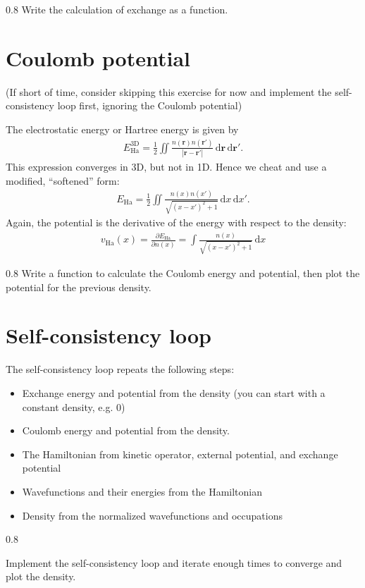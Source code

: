 \documentclass{article}
\newcommand{\exercise}[1]{
  \bigskip
  \begin{boxedminipage}[c]{0.8\linewidth}
  #1
  \end{boxedminipage}
  \bigskip
}
\newcommand{\dee}[0]{\mathrm d}
\newcommand{\idee}[0]{\,\dee}
\newcommand{\pdiff}[2]{\frac{\partial #1}{\partial #2}}
\begin{document}
\exercise{Write the calculation of exchange as a function.}

\section{Coulomb potential}
(If short of time, consider skipping this exercise for now and implement the
self-consistency loop first, ignoring the Coulomb potential)

The electrostatic energy or Hartree energy is given by
\begin{align}
  E_{\mathrm{Ha}}^{\mathrm{3D}} = \frac12 \iint \frac{n(\mathbf r)n(\mathbf r')}{|\mathbf r - \mathbf r'|}\idee \mathbf r \idee \mathbf r'.
\end{align}
This expression converges in 3D, but not in 1D.  Hence we cheat and use
a modified, ``softened'' form:
\begin{align}
E_{\mathrm{Ha}} = \frac12 \iint \frac{n(x) n(x')}{\sqrt{(x - x')^2 + 1}}
\idee x \idee x'.
\end{align}
Again, the potential is the derivative of the energy with respect to the
density:
\begin{align}
  v_{\mathrm{Ha}}(x) = \pdiff{E_{\mathrm{Ha}}}{n(x)} =
  \int \frac{n(x)}{\sqrt{(x - x')^2 + 1}} \idee x
\end{align}

\exercise{Write a function to calculate the Coulomb energy and potential,
  then plot the potential for the previous density.}

\section{Self-consistency loop}
The self-consistency loop repeats the following steps:
\begin{itemize}
\item Exchange energy and potential from the density (you can start with a
  constant density, e.g. 0)
\item Coulomb energy and potential from the density.
\item The Hamiltonian from kinetic operator, external potential,
  and exchange potential
\item Wavefunctions and their energies from the Hamiltonian
\item Density from the normalized wavefunctions and occupations
\end{itemize}


\exercise{
  Implement the self-consistency loop and iterate enough times to converge
  and plot the density.
}
\end{document}
